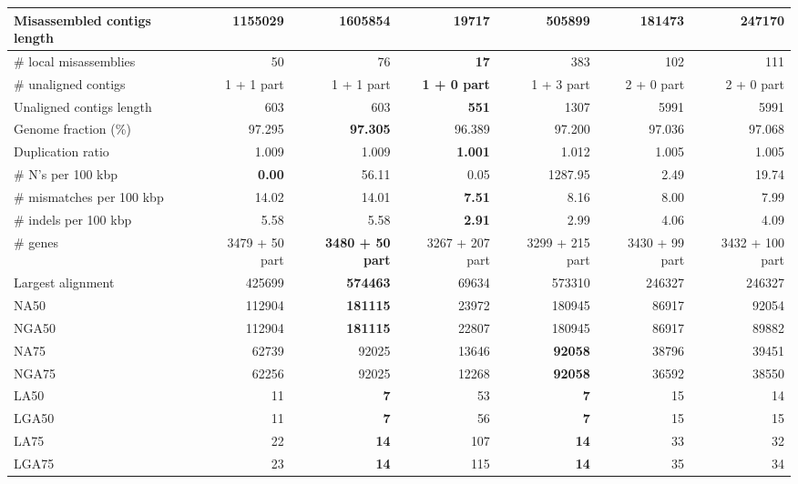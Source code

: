 \documentclass[12pt,a4paper]{article}
\begin{document}
\begin{table}[ht]
\begin{center}
\begin{tabular}{|l*{6}{|r}|}
Misassembled contigs length & 1155029 & 1605854 & {\bf 19717} & 505899 & 181473 & 247170 \\ \hline
\# local misassemblies & 50 & 76 & {\bf 17} & 383 & 102 & 111 \\ \hline
\# unaligned contigs & 1 + 1 part & 1 + 1 part & {\bf 1 + 0 part} & 1 + 3 part & 2 + 0 part & 2 + 0 part \\ \hline
Unaligned contigs length & 603 & 603 & {\bf 551} & 1307 & 5991 & 5991 \\ \hline
Genome fraction (\%) & 97.295 & {\bf 97.305} & 96.389 & 97.200 & 97.036 & 97.068 \\ \hline
Duplication ratio & 1.009 & 1.009 & {\bf 1.001} & 1.012 & 1.005 & 1.005 \\ \hline
\# N's per 100 kbp & {\bf 0.00} & 56.11 & 0.05 & 1287.95 & 2.49 & 19.74 \\ \hline
\# mismatches per 100 kbp & 14.02 & 14.01 & {\bf 7.51} & 8.16 & 8.00 & 7.99 \\ \hline
\# indels per 100 kbp & 5.58 & 5.58 & {\bf 2.91} & 2.99 & 4.06 & 4.09 \\ \hline
\# genes & 3479 + 50 part & {\bf 3480 + 50 part} & 3267 + 207 part & 3299 + 215 part & 3430 + 99 part & 3432 + 100 part \\ \hline
Largest alignment & 425699 & {\bf 574463} & 69634 & 573310 & 246327 & 246327 \\ \hline
NA50 & 112904 & {\bf 181115} & 23972 & 180945 & 86917 & 92054 \\ \hline
NGA50 & 112904 & {\bf 181115} & 22807 & 180945 & 86917 & 89882 \\ \hline
NA75 & 62739 & 92025 & 13646 & {\bf 92058} & 38796 & 39451 \\ \hline
NGA75 & 62256 & 92025 & 12268 & {\bf 92058} & 36592 & 38550 \\ \hline
LA50 & 11 & {\bf 7} & 53 & {\bf 7} & 15 & 14 \\ \hline
LGA50 & 11 & {\bf 7} & 56 & {\bf 7} & 15 & 15 \\ \hline
LA75 & 22 & {\bf 14} & 107 & {\bf 14} & 33 & 32 \\ \hline
LGA75 & 23 & {\bf 14} & 115 & {\bf 14} & 35 & 34 \\ \hline
\end{tabular}
\end{center}
\end{table}
\end{document}
